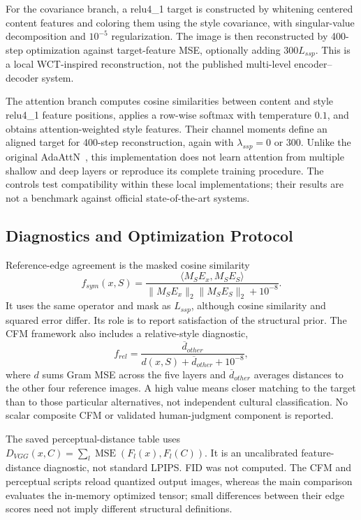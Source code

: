 For the covariance branch, a relu4\_1 target is constructed by whitening centered content features and coloring them using the style covariance, with singular-value decomposition and $10^{-5}$ regularization. The image is then reconstructed by 400-step optimization against target-feature MSE, optionally adding $300L_{ssp}$. This is a local WCT-inspired reconstruction, not the published multi-level encoder--decoder system.

The attention branch computes cosine similarities between content and style relu4\_1 feature positions, applies a row-wise softmax with temperature $0.1$, and obtains attention-weighted style features. Their channel moments define an aligned target for 400-step reconstruction, again with $\lambda_{ssp}=0$ or $300$. Unlike the original AdaAttN~\cite{liu2021}, this implementation does not learn attention from multiple shallow and deep layers or reproduce its complete training procedure. The controls test compatibility within these local implementations; their results are not a benchmark against official state-of-the-art systems.

\subsection{Diagnostics and Optimization Protocol}
Reference-edge agreement is the masked cosine similarity
\begin{equation}
f_{sym}(x,S)=\frac{\langle M_SE_x,M_SE_S\rangle}{\|M_SE_x\|_2\|M_SE_S\|_2+10^{-8}}.
\end{equation}
It uses the same operator and mask as $L_{ssp}$, although cosine similarity and squared error differ. Its role is to report satisfaction of the structural prior. The CFM framework also includes a relative-style diagnostic,
\begin{equation}
f_{rel}=\frac{\overline d_{other}}{d(x,S)+\overline d_{other}+10^{-8}},
\end{equation}
where $d$ sums Gram MSE across the five layers and $\overline d_{other}$ averages distances to the other four reference images. A high value means closer matching to the target than to those particular alternatives, not independent cultural classification. No scalar composite CFM or validated human-judgment component is reported.

The saved perceptual-distance table uses $D_{VGG}(x,C)=\sum_l\operatorname{MSE}(F_l(x),F_l(C))$. It is an uncalibrated feature-distance diagnostic, not standard LPIPS. FID was not computed. The CFM and perceptual scripts reload quantized output images, whereas the main comparison evaluates the in-memory optimized tensor; small differences between their edge scores need not imply different structural definitions.

